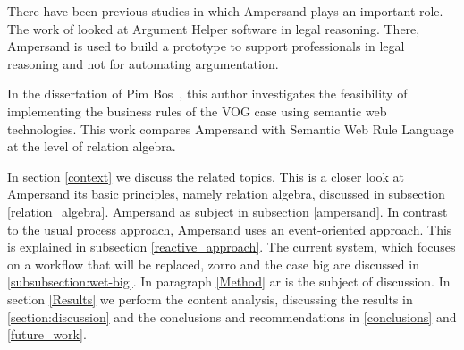 There have been previous studies in which Ampersand plays an important role.
The work of  looked at Argument Helper software in legal reasoning.
There, Ampersand is used to build a prototype to support professionals in legal reasoning and not for automating argumentation.

In the dissertation of Pim Bos~, this author investigates the feasibility of implementing the business rules of the VOG case using semantic web technologies.
This work compares Ampersand with Semantic Web Rule Language at the level of relation algebra.

In section \ref{context} we discuss the related topics.
This is a closer look at Ampersand its basic principles, namely relation algebra, discussed in subsection \ref{relation_algebra}.
Ampersand as subject in subsection \ref{ampersand}.
In contrast to the usual process approach, Ampersand uses an event-oriented approach. This is explained in subsection \ref{reactive_approach}.
The current system, which focuses on a workflow that will be replaced, \acrshort{zorro} and the case \acrshort{big} are discussed in \ref{subsubsection:wet-big}.
In paragraph \ref{Method} \acrshort{ar} is the subject of discussion.
In section \ref{Results} we perform the content analysis, discussing the results in \ref{section:discussion} and the conclusions and recommendations in \ref{conclusions} and \ref{future_work}.

